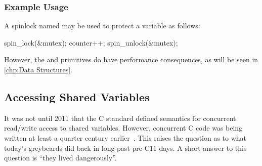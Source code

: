 \subsubsection{Example Usage}

A spinlock named  may be used to protect a variable
 as follows:

\begin{VerbatimU}
spin_lock(&mutex);
counter++;
spin_unlock(&mutex);
\end{VerbatimU}

\QuickQuizEnd

However, the  and  primitives
do have performance consequences, as will be seen in
\cref{chp:Data Structures}.

\subsection{Accessing Shared Variables}
\label{sec:toolsoftrade:Accessing Shared Variables}

It was not until 2011 that the C standard defined semantics for concurrent
read/write access to shared variables.
However, concurrent C code was being written at least a quarter century
earlier~\cite{Beck85,Inman85}.
This raises the question as to what today's greybeards did back
in long-past pre-C11 days.
A short answer to this question is ``they lived dangerously''.

